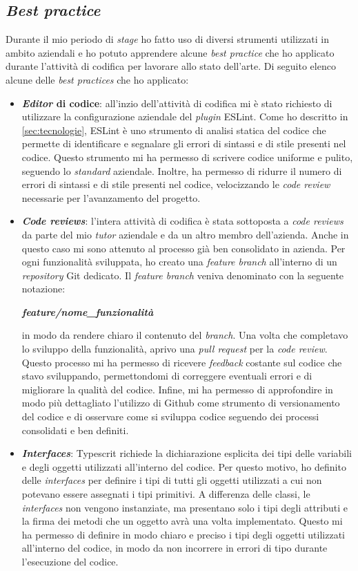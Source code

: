 \subsection{\textit{Best practice}}
Durante il mio periodo di \textit{stage} ho fatto uso di diversi strumenti utilizzati in ambito aziendali e ho potuto apprendere alcune \textit{best practice} che ho applicato durante l'attività di codifica per lavorare allo stato dell'arte. Di seguito elenco alcune delle \textit{best practices} che ho applicato:
\begin{itemize}
    \item \textbf{\textit{Editor} di codice}: all'inzio dell'attività di codifica mi è stato richiesto di utilizzare la configurazione aziendale del \textit{plugin} ESLint. Come ho descritto in \ref{sec:tecnologie}, ESLint è uno strumento di analisi statica del codice che permette di identificare e segnalare gli errori di sintassi e di stile presenti nel codice.  Questo strumento mi ha permesso di scrivere codice uniforme e pulito, seguendo lo \textit{standard} aziendale. Inoltre, ha permesso di ridurre il numero di errori di sintassi e di stile presenti nel codice, velocizzando le \textit{code review} necessarie per l'avanzamento del progetto.
    \item \textbf{\textit{Code reviews}}: l'intera attività di codifica è stata sottoposta a \textit{code reviews} da parte del mio \textit{tutor} aziendale e da un altro membro dell'azienda. Anche in questo caso mi sono attenuto al processo già ben consolidato in azienda. Per ogni funzionalità sviluppata, ho creato una \textit{feature branch} all'interno di un \textit{repository} Git dedicato. Il \textit{feature branch} veniva denominato con la seguente notazione:
    \begin{center}
        \textbf{\emph{feature/nome\_funzionalità}}
    \end{center}
    in modo da rendere chiaro il contenuto del \textit{branch}. Una volta che completavo lo sviluppo della funzionalità, aprivo una \textit{pull request} per la \textit{code review}. Questo processo mi ha permesso di ricevere \textit{feedback} costante sul codice che stavo sviluppando, permettondomi di correggere eventuali errori e di migliorare la qualità del codice. Infine, mi ha permesso di approfondire in modo più dettagliato l'utilizzo di Github come strumento di versionamento del codice e di osservare come si sviluppa codice seguendo dei processi consolidati e ben definiti.
    \item \textbf{\textit{Interfaces}}: Typescrit richiede la dichiarazione esplicita dei tipi delle variabili e degli oggetti utilizzati all'interno del codice. Per questo motivo, ho definito delle \textit{interfaces} per definire i tipi di tutti gli oggetti utilizzati a cui non potevano essere assegnati i tipi primitivi. A differenza delle classi, le \textit{interfaces} non vengono instanziate, ma presentano solo i tipi degli attributi e la firma dei metodi che un oggetto avrà una volta implementato. Questo mi ha permesso di definire in modo chiaro e preciso i tipi degli oggetti utilizzati all'interno del codice, in modo da non incorrere in errori di tipo durante l'esecuzione del codice.

\end{itemize}
